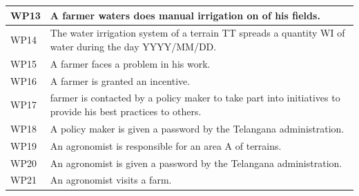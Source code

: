 \documentclass{article}
\begin{document}
\begin{longtable}[c]{|m{0.75cm}|m{11cm}|}
 \hline
 WP13 &  A farmer waters does manual irrigation on of his fields.\\
 \hline
 WP14 & The water irrigation system  of a terrain TT spreads a quantity WI of water during the day YYYY/MM/DD.\\
 \hline
 WP15 & A farmer faces a problem in his work.\\
 \hline
 WP16 & A farmer is granted an incentive.\\
 \hline
 WP17 & farmer is contacted by a policy maker to take part into initiatives to provide his best practices to others.\\
 \hline
 WP18 & A policy maker is given a password by the Telangana administration.\\
 \hline
 WP19 & An agronomist is responsible for an area A of terrains.\\
 \hline
 WP20 & An agronomist is given a password by the Telangana administration.\\
 \hline
 WP21 & An agronomist visits a farm.\\
 \hline
 \end{longtable}
 
\end{document}
